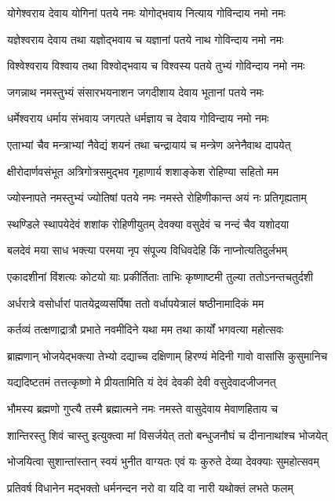 \twolineshloka
{योगेश्वराय देवाय योगिनां पतये नमः}
{योगोद्भवाय नित्याय गोविन्दाय नमो नमः}%


\twolineshloka
{यज्ञेश्वराय देवाय तथा यज्ञोद्भवाय च}
{यज्ञानां पतये नाथ गोविन्दाय नमो नमः}%


\twolineshloka
{विश्वेश्वराय विश्वाय तथा विश्वोद्भवाय च}
{विश्वस्य पतये तुभ्यं गोविन्दाय नमो नमः}%


\twolineshloka
{जगन्नाथ नमस्तुभ्यं संसारभयनाशन}
{जगदीशाय देवाय भूतानां पतये नमः}%


\twolineshloka
{धर्मेश्वराय धर्माय संभवाय जगत्पते}
{धर्मज्ञाय च देवाय गोविन्दाय नमो नमः}%


\twolineshloka
{एताभ्यां चैव मन्त्राभ्यां नैवेद्यं शयनं तथा}
{चन्द्रायाय॑ च मन्त्रेण अनेनैवाथ दापयेत्}%


\twolineshloka
{क्षीरोदार्णवसंभूत अत्रिगोत्रसमुद्भव}
{गृहाणार्य शशाङ्केश रोहिण्या सहितो मम}%


\twolineshloka
{ज्योस्नापते नमस्तुभ्यं ज्योतिषां पतये नमः}
{नमस्ते रोहिणीकान्त अयं नः प्रतिगृह्यताम्}%


\twolineshloka
{स्थण्डिले स्थापयेदेवं शशांक रोहिणीयुतम्}
{देवक्या वसुदेवं च नन्दं चैव यशोदया}%


\twolineshloka
{बलदेवं मया साध भक्त्या परमया नृप}
{संपूज्य विधिवदेहि किं नाप्नोत्यतिदुर्लभम्}%


\twolineshloka
{एकादशीनां विंशत्यः कोटयो याः प्रकीर्तिताः}
{ताभिः कृष्णाष्टमी तुल्या ततोऽनन्तचतुर्दशी}%


\twolineshloka
{अर्धरात्रे वसोर्धारां पातयेद्रव्यसर्पिषा}
{ततो वर्धापयेत्रालं षष्ठीनामादिकं मम}%


\twolineshloka
{कर्तव्यं तत्क्षणाद्रात्रौ प्रभाते नवमीदिने}
{यथा मम तथा कार्यों भगवत्या महोत्सवः}%


\twolineshloka
{ब्राह्मणान् भोजयेद्भक्त्या तेभ्यो दद्याच्च दक्षिणाम्}
{हिरण्यं मेदिनी गावो वासांसि कुसुमानिच}%


\twolineshloka
{यद्यदिष्टतमं तत्तत्कृष्णो मे प्रीयतामिति}
{यं देवं देवकी देवी वसुदेवादजीजनत्}%


\twolineshloka
{भौमस्य ब्रह्मणो गुप्त्यै तस्मै ब्रह्मात्मने नमः}
{नमस्ते वासुदेवाय मेवाणहिताय च}%


\twolineshloka
{शान्तिरस्तु शिवं चास्तु इत्युक्त्वा मां विसर्जयेत्}
{ततो बन्धुजनौघं च दीनानाथांश्च भोजयेत्}%


\twolineshloka
{भोजयित्वा सुशान्तांस्तान् स्वयं भुनीत वाग्यतः}
{एवं यः कुरुते देव्या देवक्याः सुमहोत्सवम्}%


\twolineshloka
{प्रतिवर्ष विधानेन मद्भक्तो धर्मनन्दन}
{नरो वा यदि वा नारी यथोक्तं लभते फलम्}%


